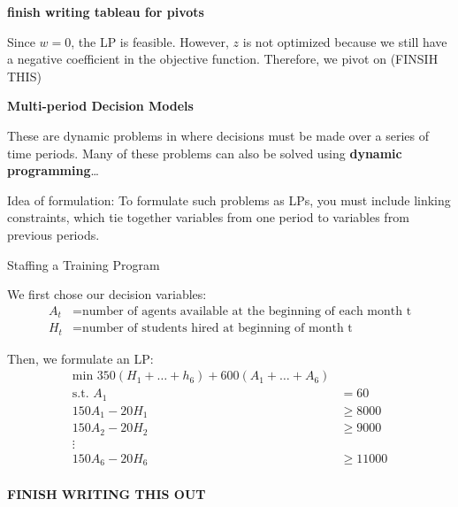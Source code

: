 \documentclass{article}
\begin{document}
\begin{answer}
    \textbf{finish writing tableau for pivots}


    Since \(w=0\), the LP is feasible. However, \(z\) is not optimized because we 
    still have a negative coefficient in the objective function. Therefore, we pivot on (FINSIH THIS)
\end{answer}

\begin{definition}{\textbf{Multi-period Decision Models}}

    These are dynamic problems in where decisions must be 
    made over a series of time periods. Many of these problems can also be solved using \textbf{dynamic programming}\dots

    Idea of formulation: To formulate such problems as LPs, you must include linking constraints, which tie 
    together variables from one period to variables from previous periods.
\end{definition}

\begin{eg}{Staffing a Training Program}



\end{eg}
\begin{answer}
    We first chose our decision variables: \\
    \begin{align*}
        A_t&= \text{number of agents available at the beginning of each month t} \\
        H_t&= \text{number of students hired at beginning of month t}
    \end{align*}

    Then, we formulate an LP: \\
    \begin{align*}
        \text{min }350(H_1+\dots+h_6)+600(A_1+\dots+A_6) \\
        \text{s.t. }A_1&=60 \\
        150A_1-20H_1&\geq8000 \\
        150A_2-20H_2&\geq 9000 \\
        \vdots \\
        150A_6-20H_6&\geq11000 \\
    \end{align*}
\end{answer}
\textbf{FINISH WRITING THIS OUT}
\end{document}
